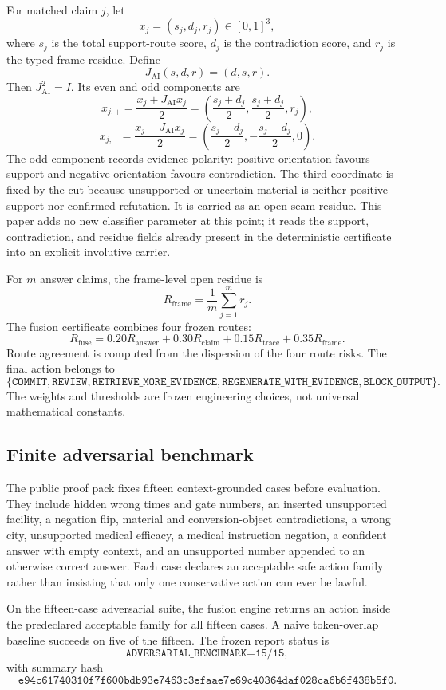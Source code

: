 For matched claim $j$, let
\[
 x_j=(s_j,d_j,r_j)\in[0,1]^3,
\]
where $s_j$ is the total support-route score, $d_j$ is the contradiction score, and $r_j$ is the typed frame residue. Define
\[
 \boxed{J_{\mathrm{AI}}(s,d,r)=(d,s,r).}
\]
Then $J_{\mathrm{AI}}^2=I$. Its even and odd components are
\[
 x_{j,+}=\frac{x_j+J_{\mathrm{AI}}x_j}{2}
 =\left(\frac{s_j+d_j}{2},\frac{s_j+d_j}{2},r_j\right),
\]
\[
 x_{j,-}=\frac{x_j-J_{\mathrm{AI}}x_j}{2}
 =\left(\frac{s_j-d_j}{2},-\frac{s_j-d_j}{2},0\right).
\]
The odd component records evidence polarity: positive orientation favours support and negative orientation favours contradiction. The third coordinate is fixed by the cut because unsupported or uncertain material is neither positive support nor confirmed refutation. It is carried as an open seam residue. This paper adds no new classifier parameter at this point; it reads the support, contradiction, and residue fields already present in the deterministic certificate into an explicit involutive carrier.

For $m$ answer claims, the frame-level open residue is
\[
 R_{\mathrm{frame}}=\frac1m\sum_{j=1}^{m}r_j.
\]
The fusion certificate combines four frozen routes:
\[
 R_{\mathrm{fuse}}
 =0.20R_{\mathrm{answer}}
 +0.30R_{\mathrm{claim}}
 +0.15R_{\mathrm{trace}}
 +0.35R_{\mathrm{frame}}.
\]
Route agreement is computed from the dispersion of the four route risks. The final action belongs to
\[
\{\texttt{COMMIT},\texttt{REVIEW},\texttt{RETRIEVE\_MORE\_EVIDENCE},
\texttt{REGENERATE\_WITH\_EVIDENCE},\texttt{BLOCK\_OUTPUT}\}.
\]
The weights and thresholds are frozen engineering choices, not universal mathematical constants.

\subsection{Finite adversarial benchmark}

The public proof pack fixes fifteen context-grounded cases before evaluation. They include hidden wrong times and gate numbers, an inserted unsupported facility, a negation flip, material and conversion-object contradictions, a wrong city, unsupported medical efficacy, a medical instruction negation, a confident answer with empty context, and an unsupported number appended to an otherwise correct answer. Each case declares an acceptable safe action family rather than insisting that only one conservative action can ever be lawful.

\begin{proposition}\label{prop:ai-adversarial}
On the fifteen-case adversarial suite, the fusion engine returns an action inside the predeclared acceptable family for all fifteen cases. A naive token-overlap baseline succeeds on five of the fifteen. The frozen report status is
\[
 \texttt{ADVERSARIAL\_BENCHMARK=15/15},
\]
with summary hash
\[
 \texttt{e94c61740310f7f600bdb93e7463c3efaae7e69c40364daf028ca6b6f438b5f0}.
\]
\end{proposition}

